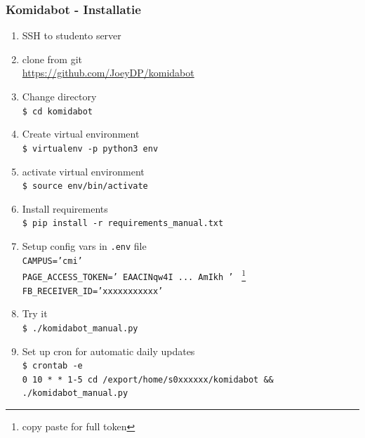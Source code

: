 \begin{frame}[allowframebreaks]
    \frametitle{Komidabot - Installatie}
    
    \begin{enumerate}
    	\item SSH to studento server
    	\item clone from git \\
        \url{https://github.com/JoeyDP/komidabot}
        
        \item Change directory \\
        \texttt{\$ cd komidabot}
        
        \item Create virtual environment \\
        \texttt{\$ virtualenv -p python3 env}
        
        \item activate virtual environment \\
        \texttt{\$ source env/bin/activate}

        \item Install requirements \\
        \texttt{\$ pip install -r requirements\_manual.txt}
        
        \framebreak
        
        \item Setup config vars in \texttt{.env} file \\
        \texttt{CAMPUS='cmi'} \\
        \texttt{PAGE\_ACCESS\_TOKEN='%
%
              EAACINqw4I ... AmIkh%
          \EndAccSupp{}%
          '%
        } \footnote{copy paste for full token} \\
        \texttt{FB\_RECEIVER\_ID='xxxxxxxxxxx'} \\
        
        \item Try it \\
        \texttt{\$ ./komidabot\_manual.py}
        
        \item Set up cron for automatic daily updates \\
        \texttt{\$ crontab -e} \\
        \footnotesize{\texttt{0 10 * * 1-5 cd /export/home/s0xxxxxx/komidabot \&\& ./komidabot\_manual.py}} \\

    \end{enumerate}

\end{frame}






